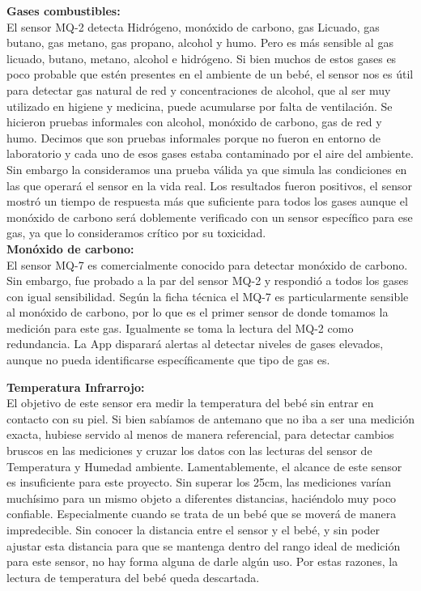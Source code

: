 \documentclass{IEEEtran}
\begin{document}
\textbf{Gases combustibles:}\\
El sensor MQ-2 detecta Hidrógeno, monóxido de carbono, gas Licuado, gas butano, gas metano, gas propano, alcohol y humo. Pero es más sensible al gas licuado, butano, metano, alcohol e hidrógeno. Si bien muchos de estos gases es poco probable que estén presentes en el ambiente de un bebé, el sensor nos es útil para detectar gas natural de red y concentraciones de alcohol, que al ser muy utilizado en higiene y medicina, puede acumularse por falta de ventilación. 
Se hicieron pruebas informales con alcohol, monóxido de carbono, gas de red y humo. Decimos que son pruebas informales porque no fueron en entorno de laboratorio y cada uno de esos gases estaba contaminado por el aire del ambiente. Sin embargo la consideramos una prueba válida ya que simula las condiciones en las que operará el sensor en la vida real. Los resultados fueron positivos, el sensor mostró un tiempo de respuesta más que suficiente para todos los gases aunque el monóxido de carbono será doblemente verificado con un sensor específico para ese gas, ya que lo consideramos crítico por su toxicidad.\\

\textbf{Monóxido de carbono:}\\
El sensor MQ-7 es comercialmente conocido para detectar monóxido de carbono. Sin embargo, fue probado a la par del sensor MQ-2 y respondió a todos los gases con igual sensibilidad. Según la ficha técnica \cite{refmq7} el MQ-7 es particularmente sensible al monóxido de carbono, por lo que es el primer sensor de donde tomamos la medición para este gas. Igualmente se toma la lectura del MQ-2 como redundancia. La App disparará alertas al detectar niveles de gases elevados, aunque no pueda identificarse específicamente que tipo de gas es.\newpage

\textbf{Temperatura Infrarrojo:}\\
El objetivo de este sensor era medir la temperatura del bebé sin entrar en contacto con su piel. Si bien sabíamos de antemano que no iba a ser una medición exacta, hubiese servido al menos de manera referencial, para detectar cambios bruscos en las mediciones y cruzar los datos con las lecturas del sensor de Temperatura y Humedad ambiente.
Lamentablemente, el alcance de este sensor es insuficiente para este proyecto. Sin superar los 25cm, las mediciones varían muchísimo para un mismo objeto a diferentes distancias, haciéndolo muy poco confiable. Especialmente cuando se trata de un bebé que se moverá de manera impredecible.
Sin conocer la distancia entre el sensor y el bebé, y sin poder ajustar esta distancia para que se mantenga dentro del rango ideal de medición para este sensor, no hay forma alguna de darle algún uso.
Por estas razones, la lectura de temperatura del bebé queda descartada.\\
\end{document}
